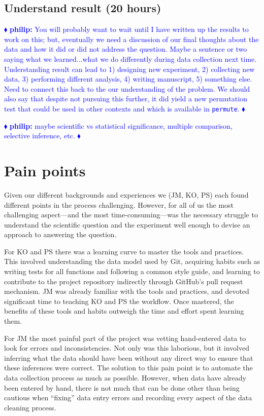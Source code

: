 \documentclass[]{article}
\newcommand{\philip}[1] { \textcolor{blue} {
\ensuremath{\blacklozenge} {\bf philip:}  {#1}
\ensuremath{\blacklozenge} } }
\begin{document}
\subsection{Understand result (20 hours)}\label{subsec:understand-result}

\philip{You will probably want to wait until I have written up the results to
work on this; but, eventually we need a discussion of our final thoughts about
the data and how it did or did not address the question.  Maybe a sentence or
two saying what we learned...what we do differently during data collection next
time.  Understanding result can lead to 1) designing new experiment, 2)
collecting new data, 3) performing different analysis, 4) writing manuscript,
5) something else.  Need to connect this back to the our understanding of the
problem.  We should also say that despite not pursuing this further, it did
yield a new permutation test that could be used in other contexts and which is
available in \texttt{permute}.  }

\philip{
maybe scientific vs statistical significance, multiple comparison, selective
inference, etc.
}

\section{Pain points}

Given our different backgrounds and experiences we (JM, KO, PS) each found
different points in the process challenging. 
However, for all of us the most challenging aspect---and the most 
time-consuming---was the necessary
struggle to understand the scientific question and the experiment
well enough to devise an approach to answering the question.

For KO and PS there was a learning curve to master the tools and practices.
This involved understanding the data model used by Git, acquiring habits such
as writing tests for all functions and following a common style guide, and
learning to contribute to the project repository indirectly through GitHub's
pull request mechanism.
JM was already familiar with the tools and practices, and devoted significant time
to teaching KO and PS the workflow.
Once mastered, the benefits of these tools and habits outweigh the time and effort
spent learning them.

For JM the most painful part of the project was vetting hand-entered data
to look for errors and inconsistencies.
Not only was this laborious, but it involved inferring what the data
should have been without any direct way to ensure that these inferences were
correct.
The solution to this pain point is to automate the data collection process as
much as possible.
However, when data have already been entered by hand, there is not much that can
be done other than being cautious when ``fixing'' data entry errors and recording
every aspect of the data cleaning process.
\end{document}
